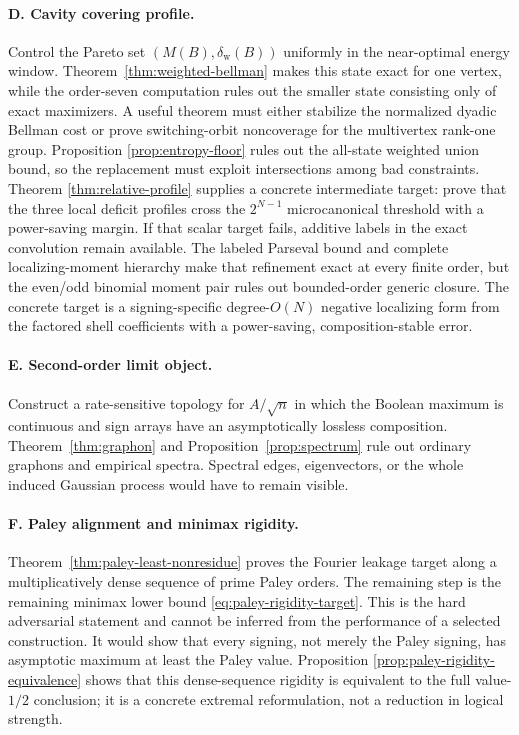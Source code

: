 \documentclass[11pt]{article}
\begin{document}
\paragraph{D. Cavity covering profile.}
Control the Pareto set $(M(B),\delta_{\mathrm w}(B))$ uniformly in the
near-optimal energy window.  Theorem~\ref{thm:weighted-bellman} makes this
state exact for one vertex, while the order-seven computation rules out the
smaller state consisting only of exact maximizers.  A useful theorem must
either stabilize the normalized dyadic Bellman cost or prove switching-orbit
noncoverage for the multivertex rank-one group.  Proposition
\ref{prop:entropy-floor} rules out the all-state weighted union bound, so the
replacement must exploit intersections among bad constraints.  Theorem
\ref{thm:relative-profile} supplies a concrete intermediate target: prove
that the three local deficit profiles cross the $2^{N-1}$ microcanonical
threshold with a power-saving margin.  If that scalar target fails, additive
labels in the exact convolution remain available.  The labeled Parseval bound
and complete localizing-moment hierarchy make that refinement exact at every
finite order, but the even/odd binomial moment pair rules out bounded-order
generic closure.  The concrete target is a signing-specific degree-$O(N)$
negative localizing form from the factored shell coefficients with a
power-saving, composition-stable error.

\paragraph{E. Second-order limit object.}
Construct a rate-sensitive topology for \(A/\sqrt n\) in which the Boolean
maximum is continuous and sign arrays have an asymptotically lossless
composition.  Theorem~\ref{thm:graphon} and
Proposition~\ref{prop:spectrum} rule out ordinary graphons and empirical
spectra.  Spectral edges, eigenvectors, or the whole induced Gaussian process
would have to remain visible.

\paragraph{F. Paley alignment and minimax rigidity.}
Theorem~\ref{thm:paley-least-nonresidue} proves the Fourier leakage target
along a multiplicatively dense sequence of prime Paley orders.  The remaining
step is the remaining minimax lower bound
\eqref{eq:paley-rigidity-target}.  This is the hard adversarial statement and
cannot be inferred from the performance of a selected construction.  It
would show that every signing, not merely the Paley signing, has asymptotic
maximum at least the Paley value.  Proposition
\ref{prop:paley-rigidity-equivalence} shows that this dense-sequence rigidity
is equivalent to the full value-$1/2$ conclusion; it is a concrete extremal
reformulation, not a reduction in logical strength.
\end{document}

